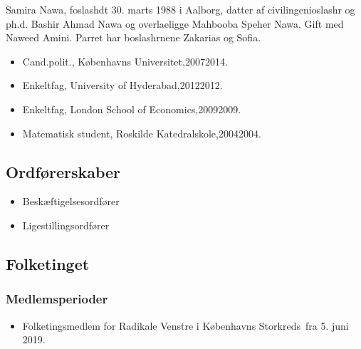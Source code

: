 \documentclass[11pt, a4paper]{awesome-cv}
\begin{document}
\makecvheader[R]
\makelettertitle
\begin{cvletter}
Samira Nawa, foslashdt 30. marts 1988 i Aalborg, datter af civilingenioslashr og ph.d. Bashir Ahmad Nawa og overlaeligge Mahbooba Speher Nawa. Gift med Naweed Amini. Parret har boslashrnene Zakarias og Sofia.

\begin{itemize}
\item Cand.polit., Københavns Universitet,20072014.
\item Enkeltfag, University of Hyderabad,20122012.
\item Enkeltfag, London School of Economics,20092009.
\item Matematisk student, Roskilde Katedralskole,20042004.
\end{itemize}
\subsection*{Ordførerskaber}
\begin{itemize}
\item Beskæftigelsesordfører
\item Ligestillingsordfører
\end{itemize}
\subsection*{Folketinget}
\subsubsection*{Medlemsperioder}
\begin{itemize}
\item Folketingsmedlem for Radikale Venstre i Københavns Storkreds fra 5. juni 2019.
\end{itemize}

\end{cvletter}
\end{document}
